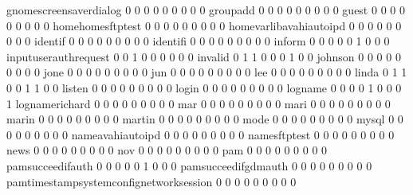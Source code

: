 \documentclass[compress,8pt]{beamer}
\begin{document}
\begin{frame}
\begin{Schunk}
  gnomescreensaverdialog                     0   0   0   0   0   0   0   0   0
  groupadd                                   0   0   0   0   0   0   0   0   0
  guest                                      0   0   0   0   0   0   0   0   0
  homehomesftptest                           0   0   0   0   0   0   0   0   0
  homevarlibavahiautoipd                     0   0   0   0   0   0   0   0   0
  identif                                    0   0   0   0   0   0   0   0   0
  identifi                                   0   0   0   0   0   0   0   0   0
  inform                                     0   0   0   0   0   1   0   0   0
  inputuserauthrequest                       0   0   1   0   0   0   0   0   0
  invalid                                    0   1   1   0   0   0   1   0   0
  johnson                                    0   0   0   0   0   0   0   0   0
  jone                                       0   0   0   0   0   0   0   0   0
  jun                                        0   0   0   0   0   0   0   0   0
  lee                                        0   0   0   0   0   0   0   0   0
  linda                                      0   1   1   0   0   1   1   0   0
  listen                                     0   0   0   0   0   0   0   0   0
  login                                      0   0   0   0   0   0   0   0   0
  logname                                    0   0   0   0   1   0   0   0   1
  lognamerichard                             0   0   0   0   0   0   0   0   0
  mar                                        0   0   0   0   0   0   0   0   0
  mari                                       0   0   0   0   0   0   0   0   0
  marin                                      0   0   0   0   0   0   0   0   0
  martin                                     0   0   0   0   0   0   0   0   0
  mode                                       0   0   0   0   0   0   0   0   0
  mysql                                      0   0   0   0   0   0   0   0   0
  nameavahiautoipd                           0   0   0   0   0   0   0   0   0
  namesftptest                               0   0   0   0   0   0   0   0   0
  news                                       0   0   0   0   0   0   0   0   0
  nov                                        0   0   0   0   0   0   0   0   0
  pam                                        0   0   0   0   0   0   0   0   0
  pamsucceedifauth                           0   0   0   0   0   1   0   0   0
  pamsucceedifgdmauth                        0   0   0   0   0   0   0   0   0
  pamtimestampsystemconfignetworksession     0   0   0   0   0   0   0   0   0

\end{Schunk}
\end{frame}
\end{document}
